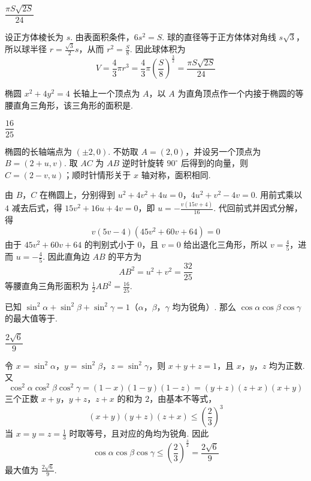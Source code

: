 \begin{answer}
\(\dfrac{\pi S\sqrt{2S}}{24}\)
\end{answer}

\begin{solution}
设正方体棱长为 \(s\). 由表面积条件，\(6s^2=S\). 球的直径等于正方体体对角线 \(s\sqrt3\)，所以球半径 \(r=\frac{\sqrt3}{2}s\)，从而 \(r^2=\frac S8\). 因此球体积为
\[
V=\frac43\pi r^3=\frac43\pi\left(\frac S8\right)^{\frac{3}{2}}=\frac{\pi S\sqrt{2S}}{24}
\]
\end{solution}

\begin{problem}
椭圆 \( x^{2} + 4y^{2} = 4 \) 长轴上一个顶点为 \(A\)，以 \(A\) 为直角顶点作一个内接于椭圆的等腰直角三角形，该三角形的面积是\fillinblank{}.
\end{problem}

\begin{answer}
\(\dfrac{16}{25}\)
\end{answer}

\begin{solution}
椭圆的长轴端点为 \((\pm2,0)\). 不妨取 \(A=(2,0)\)，并设另一个顶点为 \(B=(2+u,v)\). 取 \(AC\) 为 \(AB\) 逆时针旋转 \(90^\circ\) 后得到的向量，则 \(C=(2-v,u)\)；顺时针情形关于 \(x\) 轴对称，面积相同.

由 \(B\)，\(C\) 在椭圆上，分别得到
\(u^2+4v^2+4u=0\)，\(4u^2+v^2-4v=0\).
用前式乘以 \(4\) 减去后式，得 \(15v^2+16u+4v=0\)，即 \(u=-\frac{v(15v+4)}{16}\). 代回前式并因式分解，得
\[
v(5v-4)(45v^2+60v+64)=0
\]
由于 \(45v^2+60v+64\) 的判别式小于 \(0\)，且 \(v=0\) 给出退化三角形，所以 \(v=\frac45\)，进而 \(u=-\frac45\). 因此直角边 \(AB\) 的平方为
\[
AB^2=u^2+v^2=\frac{32}{25}
\]
等腰直角三角形面积为 \(\frac12AB^2=\frac{16}{25}\).
\end{solution}

\begin{problem}
已知 \(\sin^2\alpha + \sin^2\beta + \sin^2\gamma = 1\)（\(\alpha\)，\(\beta\)，\(\gamma\) 均为锐角）. 那么 \(\cos\alpha\cos\beta\cos\gamma\) 的最大值等于\fillinblank{}.
\end{problem}

\begin{answer}
\(\dfrac{2\sqrt6}{9}\)
\end{answer}

\begin{solution}
令 \(x=\sin^2\alpha\)，\(y=\sin^2\beta\)，\(z=\sin^2\gamma\)，则 \(x+y+z=1\)，且 \(x\)，\(y\)，\(z\) 均为正数. 又
\[
\cos^2\alpha\cos^2\beta\cos^2\gamma=(1-x)(1-y)(1-z)=(y+z)(z+x)(x+y)
\]
三个正数 \(x+y\)，\(y+z\)，\(z+x\) 的和为 \(2\)，由基本不等式，
\[
(x+y)(y+z)(z+x)\leqslant\left(\frac23\right)^3
\]
当 \(x=y=z=\frac13\) 时取等号，且对应的角均为锐角. 因此
\[
\cos\alpha\cos\beta\cos\gamma\leqslant\left(\frac23\right)^{\frac{3}{2}}=\frac{2\sqrt6}{9}
\]
最大值为 \(\frac{2\sqrt6}{9}\).
\end{solution}

